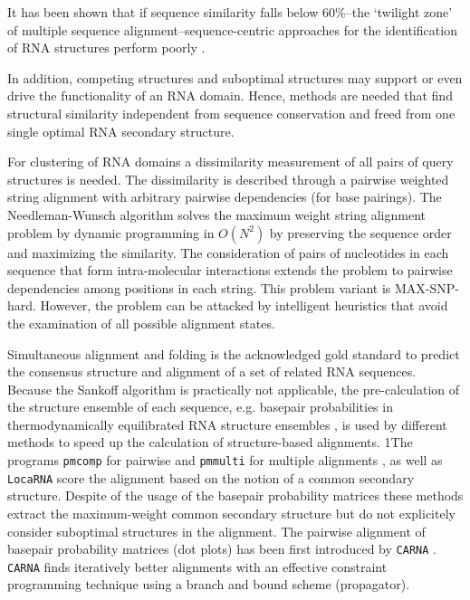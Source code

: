 \documentclass[a4paper,11pt]{article}
\newcommand\pmcomp{\texttt{pmcomp}}
\newcommand\pmmulti{\texttt{pmmulti}}
\newcommand\locarna{\texttt{LocaRNA}}
\newcommand\carna{\texttt{CARNA}}
\begin{document}
It has been shown that if sequence similarity falls below 60\%--the 
`twilight zone' of multiple sequence alignment--sequence-centric approaches 
for the identification of RNA structures perform poorly  \cite{Gardner15860779}. 

In addition, competing structures and
suboptimal structures may support or even drive the functionality of an RNA
domain. Hence, methods are needed that find structural similarity independent
from sequence conservation and freed from one single optimal RNA secondary
structure.

For clustering of RNA domains a dissimilarity measurement of all pairs of query
structures is needed. The dissimilarity is described through a pairwise weighted
string alignment with arbitrary pairwise dependencies (for base pairings). The
Needleman-Wunsch algorithm solves the maximum weight string alignment
problem by dynamic programming in $O(N^2)$ by preserving the sequence order and
maximizing the similarity. The consideration of pairs of nucleotides in each
sequence that form intra-molecular interactions extends the problem to pairwise
dependencies among positions in each string. This problem variant is
MAX-SNP-hard. However, the problem can be attacked by intelligent heuristics
that avoid the examination of all possible alignment states.

Simultaneous alignment and folding \cite{sankoff85} is the acknowledged gold
standard to predict the consensus structure and alignment of a set of related
RNA sequences. Because the Sankoff algorithm is practically not applicable, the
pre-calculation of the structure ensemble of each sequence, e.g. basepair
probabilities in thermodynamically equilibrated RNA structure ensembles
\cite{McCaskill:1990}, is used by different methods to speed up the calculation
of structure-based alignments. 1The programs \pmcomp{} for pairwise and
\pmmulti{} for multiple alignments \cite{Hofacker15073017}, as well as
\locarna{} \cite{Will17432929} score the alignment based on the notion of a
common secondary structure. Despite of the usage of the basepair probability
matrices these methods extract the maximum-weight common secondary structure but
do not explicitely consider suboptimal structures in the alignment. The pairwise
alignment of basepair probability matrices (dot plots) has been first introduced
by \carna{} \cite{Palu2010,Sorescu2012}. \carna{} finds iteratively better
alignments with an effective constraint programming technique using a branch and
bound scheme (propagator).
\end{document}
